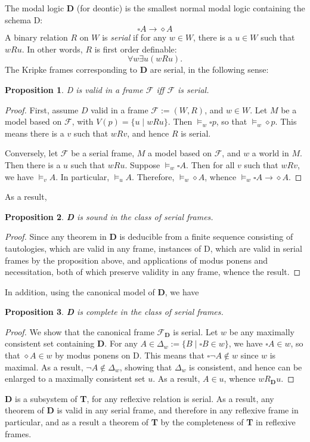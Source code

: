 \documentclass[12pt]{article}
\newtheorem{prop}{Proposition}
\begin{document}
The modal logic \textbf{D} (for deontic) is the smallest normal modal logic containing the schema D:
$$\square A \to \diamond A$$
A binary relation $R$ on $W$ is \emph{serial} if for any $w\in W$, there is a $u\in W$ such that $w R u$.  In other words, $R$ is first order definable: $$\forall w \exists u (w R u).$$
The Kripke frames corresponding to \textbf{D} are serial, in the following sense:

\begin{prop} D is valid in a frame $\mathcal{F}$ iff $\mathcal{F}$ is serial. \end{prop}
\begin{proof}  First, assume $D$ valid in a frame $\mathcal{F}:=(W,R)$, and $w\in W$.  Let $M$ be a model based on $\mathcal{F}$, with $V(p)=\lbrace u\mid w R u\rbrace$.  Then $\models_w \square p$, so that $\models_w \diamond p$.  This means there is a $v$ such that $w R v$, and hence $R$ is serial.

Conversely, let $\mathcal{F}$ be a serial frame, $M$ a model based on $\mathcal{F}$, and $w$ a world in $M$.  Then there is a $u$ such that $w R u$.  Suppose $\models_w \square A$.  Then for all $v$ such that $w R v$, we have $\models_v A$.  In particular, $\models_u A$.  Therefore, $\models_w \diamond A$, whence $\models_w \square A \to \diamond A$.
\end{proof}

As a result,
\begin{prop} \textbf{D} is sound in the class of serial frames. \end{prop}
\begin{proof}  Since any theorem in \textbf{D} is deducible from a finite sequence consisting of tautologies, which are valid in any frame, instances of D, which are valid in serial frames by the proposition above, and applications of modus ponens and necessitation, both of which preserve validity in any frame, whence the result.
\end{proof}

In addition, using the canonical model of \textbf{D}, we have
\begin{prop} \textbf{D} is complete in the class of serial frames. \end{prop}
\begin{proof}  We show that the canonical frame $\mathcal{F}_{\textbf{D}}$ is serial.  Let $w$ be any maximally consistent set containing \textbf{D}.  For any $A \in \Delta_w:=\lbrace B \mid \square B \in w \rbrace$, we have $\square A \in w$, so that $\diamond A\in w$ by modus ponens on D.  This means that $\square \neg A \notin w$ since $w$ is maximal.  As a result, $\neg A \notin \Delta_w$, showing that $\Delta_w$ is consistent, and hence can be enlarged to a maximally consistent set $u$.  As a result, $A \in u$, whence $w R_{\textbf{D}} u$.
\end{proof}

\textbf{D} is a subsystem of \textbf{T}, for any reflexive relation is serial.  As a result, any theorem of \textbf{D} is valid in any serial frame, and therefore in any reflexive frame in particular, and as a result a theorem of \textbf{T} by the completeness of \textbf{T} in reflexive frames.

\end{document}
